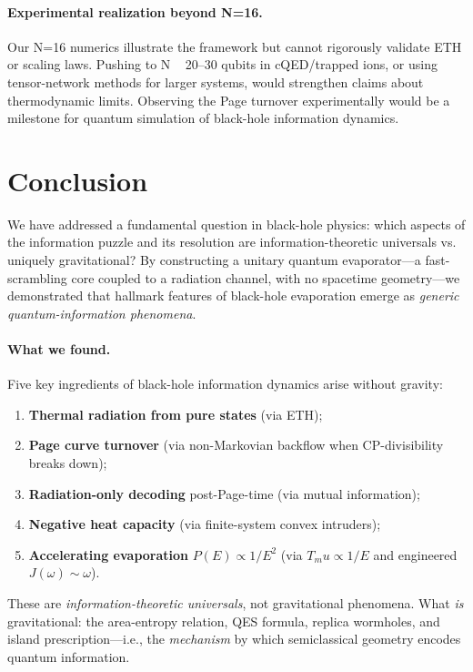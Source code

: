 \documentclass[aps,prx,onecolumn,showpacs,superscriptaddress,longbibliography,nofootinbib]{revtex4-2}
\def\mu{mu}%
\begin{document}
\paragraph{Experimental realization beyond N=16.}
Our N=16 numerics illustrate the framework but cannot rigorously validate ETH or scaling laws. Pushing to N ~ 20--30 qubits in cQED/trapped ions, or using tensor-network methods for larger systems, would strengthen claims about thermodynamic limits. Observing the Page turnover experimentally would be a milestone for quantum simulation of black-hole information dynamics.

\section{Conclusion}

We have addressed a fundamental question in black-hole physics: which aspects of the information puzzle and its resolution are information-theoretic universals vs. uniquely gravitational? By constructing a unitary quantum evaporator---a fast-scrambling core coupled to a radiation channel, with no spacetime geometry---we demonstrated that hallmark features of black-hole evaporation emerge as \emph{generic quantum-information phenomena}.

\paragraph{What we found.}
Five key ingredients of black-hole information dynamics arise without gravity:
\begin{enumerate}[leftmargin=*]
\item \textbf{Thermal radiation from pure states} (via ETH);
\item \textbf{Page curve turnover} (via non-Markovian backflow when CP-divisibility breaks down);
\item \textbf{Radiation-only decoding} post-Page-time (via mutual information);
\item \textbf{Negative heat capacity} (via finite-system convex intruders);
\item \textbf{Accelerating evaporation} $P(E) \propto 1/E^2$ (via $T_\mu \propto 1/E$ and engineered $J(\omega) \sim \omega$).
\end{enumerate}
These are \emph{information-theoretic universals}, not gravitational phenomena. What \emph{is} gravitational: the area-entropy relation, QES formula, replica wormholes, and island prescription---i.e., the \emph{mechanism} by which semiclassical geometry encodes quantum information.
\end{document}

